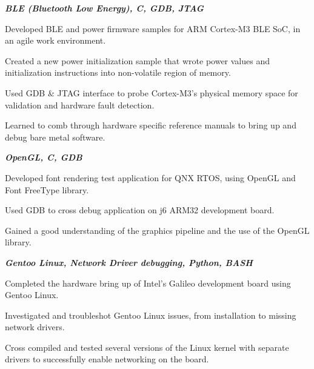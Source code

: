 \documentclass[letterpaper, 10pt]{deedy-resume} %
\begin{document}
\begin{minipage}[t]{0.65\textwidth}
\textit{\bf{BLE (Bluetooth Low Energy), C, GDB, JTAG}}
\vspace{\topsep} %
\begin{tightitemize}
\item Developed BLE and power firmware samples for ARM Cortex-M3 BLE SoC, in an agile work environment.
\item Created a new power initialization sample that wrote power values and initialization instructions into non-volatile region of memory.
\item Used GDB \& JTAG interface to probe Cortex-M3's physical memory space for validation and hardware fault detection.
\item Learned to comb through hardware specific reference manuals to bring up and debug bare metal software. 
\end{tightitemize}

\sectionspace
{}
\textit{\bf{OpenGL, C, GDB}}
\vspace{\topsep} %
\begin{tightitemize}
\item Developed font rendering test application for QNX RTOS, using OpenGL and Font FreeType library. 
\item Used GDB to cross debug application on j6 ARM32 development board.
\item Gained a good understanding of the graphics pipeline and the use of the OpenGL library. 
\end{tightitemize}
\sectionspace

\textit{\bf{Gentoo Linux, Network Driver debugging, Python, BASH}}
\vspace{\topsep} %
\begin{tightitemize}
\item Completed the hardware bring up of Intel's Galileo development board using Gentoo Linux. 
\item Investigated and troubleshot Gentoo Linux issues, from installation to missing network drivers.
\item Cross compiled and tested several versions of the Linux kernel with separate drivers to successfully enable networking on the board. 
\end{tightitemize}
\sectionspace

\end{minipage} %
\end{document}
